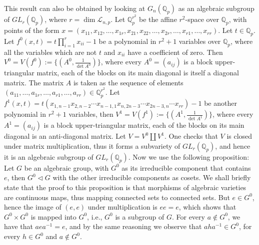 \documentclass{article}
\begin{document}
This result can also be obtained by looking at $G_{n}(\mathbb{Q}_{p})$ as an algebraic subgroup of $GL_{r}(\mathbb{Q}_{p})$, where $r=\dim\mathcal{L}_{n,p}$. Let $\mathbb{Q}_{p}^{r^2}$ be the affine $r^2$-space over $\mathbb{Q}_{p}$, with points of the form $x=(x_{11},x_{12},\dots,x_{1r},x_{21},x_{22},\dots,x_{2r},\dots,x_{r1},\dots,x_{rr})$. Let $t\in\mathbb{Q}_{p}$. Let $f^{0}(x,t)=t\prod_{i=1}^{r}x_{ii}-1$ be a polynomial in $r^2+1$ variables over $\mathbb{Q}_{p}$, where all the variables which are not $t$ and $x_{ii}$ have a coefficient of zero. Then $V^{0}=V(f^{0}):=\{(A^{0},\frac{1}{\det{A^{0}}})\}$, where every $A^{0}=(a_{ij})$ is a block upper-triangular matrix, each of the blocks on its main diagonal is itself a diagonal matrix. The matrix $A$ is taken as the sequence of elements $(a_{11},\dots,a_{1r},\dots,a_{r1},\dots,a_{rr})\in\mathbb{Q}_{p}^{r^2}$. Let $f^{1}(x,t)=t(x_{1,n-1}x_{2,n-2}\cdots{x_{n-1,1}}x_{n,2n-3}\cdots{x_{2n-3,n}}\cdots{x_{rr}})-1$ be another polynomial in $r^2+1$ variables, then $V^{1}=V(f^{1}):=\{(A^{1},\frac{1}{\det{A^{1}}})\}$, where every $A^{1}=(a_{ij})$ is a block upper-triangular matrix, each of the blocks on its main diagonal is an anti-diagonal matrix.
Let $V=V^{0}\coprod{V^{1}}$. One checks that $V$ is closed under matrix multiplication, thus it forms a subvariety of $GL_{r}(\mathbb{Q}_{p})$, and hence it is an algebraic subgroup of $GL_{r}(\mathbb{Q}_{p})$. Now we use the following proposition: Let $G$ be an algebraic group, with $G^{0}$ as its irreducible component that contains $e$, then $G^{0}\triangleleft{G}$ with the other irreducible components as cosets. We shall briefly state that the proof to this proposition is that morphisms of algebraic varieties are continuous maps, thus mapping connected sets to connected sets. But $e\in{G^{0}}$, hence the image of $(e,e)$ under multiplication is $ee=e$, which shows that $G^{0}\times{G^{0}}$ is mapped into $G^{0}$, i.e., $G^{0}$ is a subgroup of $G$. For every $a\notin{G^{0}}$, we have that $aea^{-1}=e$, and by the same reasoning we observe that $aha^{-1}\in{G^{0}}$, for every $h\in{G^{0}}$ and $a\notin{G^{0}}$.
\end{document}
